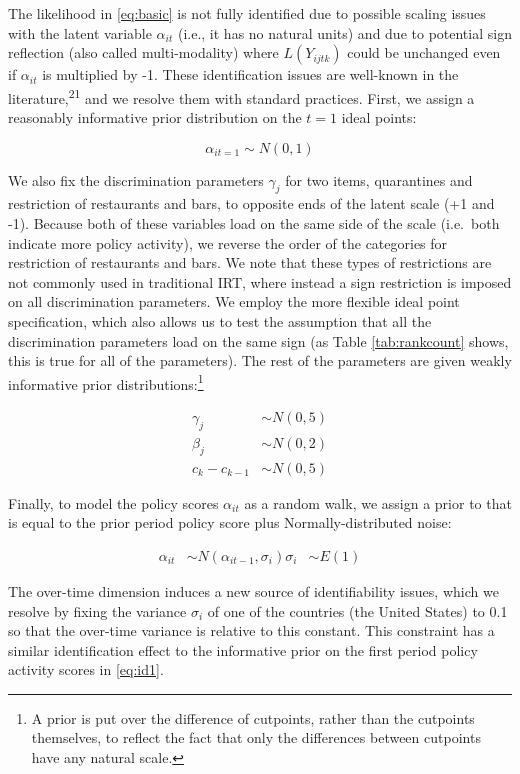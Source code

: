 \documentclass[
]{article}
\begin{document}
The likelihood in \eqref{eq:basic} is not fully identified due to possible scaling issues with the latent variable \(\alpha_{it}\) (i.e., it has no natural units) and due to potential sign reflection (also called multi-modality) where \(L(Y_{ijtk})\) could be unchanged even if \(\alpha_{it}\) is multiplied by -1. These identification issues are well-known in the literature,\textsuperscript{21} and we resolve them with standard practices. First, we assign a reasonably informative prior distribution on the \(t=1\) ideal points:

\begin{equation}
\alpha_{it=1} \sim N(0,1)
\label{eq:id1}
\end{equation}

We also fix the discrimination parameters \(\gamma_j\) for two items, quarantines and restriction of restaurants and bars, to opposite ends of the latent scale (+1 and -1). Because both of these variables load on the same side of the scale (i.e.~both indicate more policy activity), we reverse the order of the categories for restriction of restaurants and bars. We note that these types of restrictions are not commonly used in traditional IRT, where instead a sign restriction is imposed on all discrimination parameters. We employ the more flexible ideal point specification, which also allows us to test the assumption that all the discrimination parameters load on the same sign (as Table \ref{tab:rankcount} shows, this is true for all of the parameters). The rest of the parameters are given weakly informative prior distributions:\footnote{A prior is put over the difference of cutpoints, rather than the cutpoints themselves, to reflect the fact that only the differences between cutpoints have any natural scale.}

\begin{align}
\gamma_j &\sim N(0,5)\\
\beta_j &\sim N(0,2)\\
c_k - c_{k-1} &\sim N(0,5)
\label{eq:id2}
\end{align}

Finally, to model the policy scores \(\alpha_{it}\) as a random walk, we assign a prior to that is equal to the prior period policy score plus Normally-distributed noise:

\begin{align}
\alpha_{it} &\sim N(\alpha_{it-1},\sigma_i)
\sigma_i &\sim E(1)
\label{eq:rwc}
\end{align}

The over-time dimension induces a new source of identifiability issues, which we resolve by fixing the variance \(\sigma_i\) of one of the countries (the United States) to 0.1 so that the over-time variance is relative to this constant. This constraint has a similar identification effect to the informative prior on the first period policy activity scores in \eqref{eq:id1}.
\end{document}
